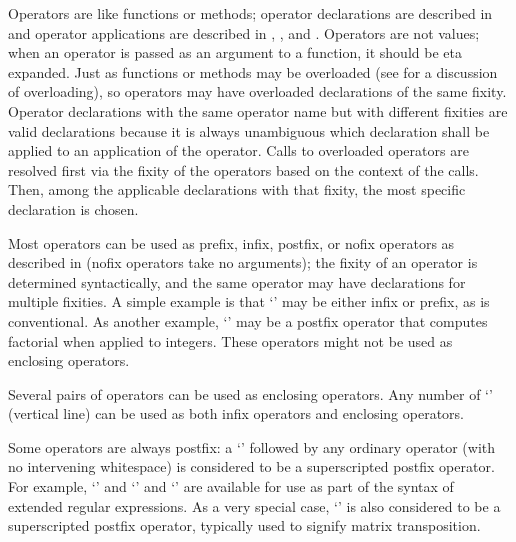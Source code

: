 %
%
%
%



Operators are like functions or methods; operator declarations are
described in  and operator applications are
described in , , and
.
Operators are not values; when an operator is passed as an argument to a
function, it should be eta expanded.
Just as functions or methods may be overloaded (see
 for a discussion of overloading),
so operators may have overloaded declarations of the same fixity.
Operator declarations with the same operator name but with different fixities
are valid declarations because it is always unambiguous which declaration
shall be applied to an application of the operator.
Calls to overloaded operators are resolved first via the
fixity of the operators based on the context of the calls.
Then, among the applicable declarations with that fixity,
the most specific declaration is chosen.

Most operators can be used as prefix, infix, postfix, or
nofix operators as described in 
(nofix operators take no arguments);
the fixity of an operator is determined syntactically,
and the same operator may have declarations for multiple fixities.
A simple example is that `\EXP{-}' may be either infix or prefix,
as is conventional.
As another example, `\EXP{!}' may be a
postfix operator that computes factorial when applied to integers.
These operators might not be used as enclosing operators.


Several pairs of operators can be used as enclosing operators.  Any number
of `\txt{|}' (vertical line) can be used as both infix operators and
enclosing operators.


Some operators are always postfix: a `' followed by
any ordinary operator (with no intervening whitespace) is considered to be a
superscripted postfix operator.  For example, `' and
`' and `'
are available for use as part
of the syntax of extended regular expressions.  As a very special case,
`' is also considered to be a superscripted
postfix operator,
typically used to signify matrix transposition.


